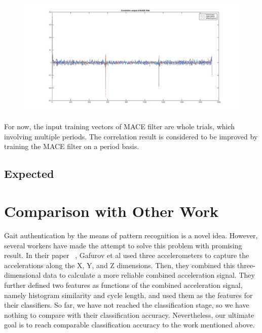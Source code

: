 \documentclass[10pt,twocolumn,letterpaper]{article}
\begin{document}
\begin{itemize}
\begin{figure}[t]
\begin{center}
   \includegraphics[width=0.8\linewidth]{../img/fig10.jpg}
   \caption{}
\end{center}
\end{figure}

For now, the input training vectors of MACE filter are whole trials, which involving multiple periods. The correlation result is considered to be improved by training the MACE filter on a period basis.
    \end{itemize}

\subsection{Expected}

\section{Comparison with Other Work}
Gait authentication by the means of pattern recognition is a novel idea. However, several workers have made the attempt to solve this problem with promising result. In their paper ~\cite{Author03}, Gafurov et al used three accelerometers to capture the accelerations along the X, Y, and Z dimensions. Then, they combined this three-dimensional data to calculate a more reliable combined acceleration signal. They further defined two features as functions of the combined acceleration signal, namely histogram similarity and cycle length, and used them as the features for their classifiers. So far, we have not reached the classification stage, so we have nothing to compare with their classification accuracy. Nevertheless, our ultimate goal is to reach comparable classification accuracy to the work mentioned above.

{\small


}
\end{document}
